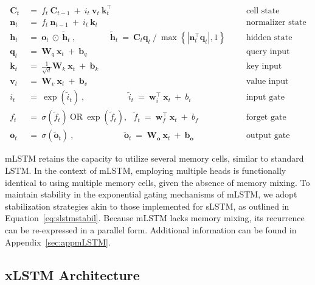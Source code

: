 \begin{align}
\label{eq:mlstm_recurrent_begin}
\mathbf{C}_t \ &= \  f_t \ \mathbf{C}_{t-1} \ + \ 
  i_t \ \mathbf{v}_t \ \mathbf{k}_t^\top & &  &\text{cell state} \\
\mathbf{n}_t \ &= \  f_t \ \mathbf{n}_{t-1} \ + \ 
  i_t \ \mathbf{k}_t & &  &\text{normalizer state} \\
\mathbf{h}_t  \ &= \ \mathbf{o}_t \ \odot \ \tilde{\mathbf{h}}_t
\ , \qquad \qquad 
\tilde{\mathbf{h}}_t \ = \   \mathbf{C}_t \mathbf{q}_t \ / \ 
  \max \left\{ |\mathbf{n}_t^\top \mathbf{q}_t|, 1 \right\} 
   &&&\text{hidden state} \\
\mathbf{q}_t \ &= \ \mathbf{W}_q \ \mathbf{x}_t \ + \ \mathbf{b}_q  & &  &\text{query input} \\
\mathbf{k}_t \ &= \ \frac{1}{\sqrt{d}} \mathbf{W}_k \ \mathbf{x}_t \ + \ \mathbf{b}_k  & &  &\text{key input} \\
\mathbf{v}_t \ &= \ \mathbf{W}_v \ \mathbf{x}_t \ + \ \mathbf{b}_v  & &  &\text{value input} \\
i_t \ &= \ \!\exp \!  \! \left( \tilde{i}_t  \right) \ , 
 \qquad \qquad \ \ \ \ \,
  \tilde{i}_t \ = \ \mathbf{w}^\top_{i} \ \mathbf{x}_t \ + \  b_{i} \ \ \ 
  &&&\text{input gate} \\
f_t \ &= \ \sigma \!  \left(  \tilde{f}_t \right) \ \text{OR} \ \!\exp \!  \! \left(  \tilde{f}_t \right) , \ \ \: \!
\tilde{f}_t \ = \ \mathbf{w}^\top_{f} \ \mathbf{x}_t  \ + \
  b_{f}
  &&& \text{forget gate} \\
\label{eq:mlstm_recurrent_end}
\mathbf{o}_t \ &= \ \sigma \left( \tilde{\mathbf{o}}_t \right) \ , \qquad \qquad \quad \ \ \ \,
  \tilde{\mathbf{o}}_t  \ = \ \mathbf{W}_{\mathbf{o}} \ \mathbf{x}_t \ + \
  \mathbf{b}_{\mathbf{o}}
  &&&\text{output gate} 
\end{align}

mLSTM retains the capacity to utilize several memory cells, similar to standard LSTM. In the context of mLSTM, employing multiple heads is functionally identical to using multiple memory cells, given the absence of memory mixing. To maintain stability in the exponential gating mechanisms of mLSTM, we adopt stabilization strategies akin to those implemented for sLSTM, as outlined in Equation~\ref{eq:slstmstabil}. Because mLSTM lacks memory mixing, its recurrence can be re-expressed in a parallel form. Additional information can be found in Appendix~\ref{sec:appmLSTM}.

\subsection{xLSTM Architecture}
\label{sec:xLSTMarch}

